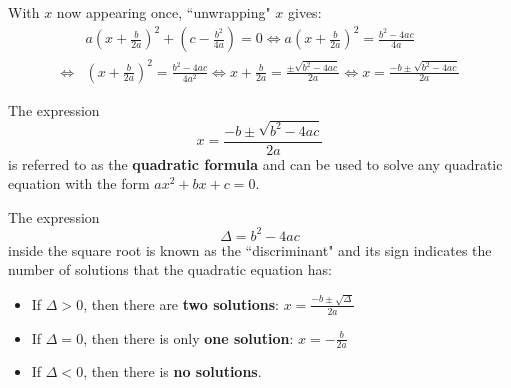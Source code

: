 \documentclass{article}
\begin{document}
With \(x\) now appearing once, ``unwrapping" \(x\) gives:
\begin{align*}
& a(x + \frac{b}{2a})^2 + (c - \frac{b^2}{4a}) = 0 
\iff a(x + \frac{b}{2a})^2 = \frac{b^2 - 4ac}{4a} \\
\iff & (x + \frac{b}{2a})^2 = \frac{b^2 - 4ac}{4a^2} 
\iff x + \frac{b}{2a} = \frac{\pm\sqrt{b^2 - 4ac}}{2a} 
\iff x = \frac{-b \pm\sqrt{b^2 - 4ac}}{2a}  
\end{align*}

The expression 
\[x = \frac{-b \pm\sqrt{b^2 - 4ac}}{2a}\]
is referred to as the {\bf quadratic formula} and can be used to solve any quadratic equation with the form \(ax^2 + bx + c = 0\). 

The expression 
\[\Delta  = b^2 - 4ac\] 
inside the square root is known as the ``discriminant" and its sign indicates the number of solutions that the quadratic equation has:
\begin{itemize}
\item If \(\Delta > 0\), then there are {\bf two solutions}: \(x = \frac{-b \pm \sqrt{\Delta}}{2a}\)
\item If \(\Delta = 0\), then there is only {\bf one solution}: \(x = -\frac{b}{2a}\) 
\item If \(\Delta < 0\), then there is {\bf no solutions}.
\end{itemize}
\end{document}
